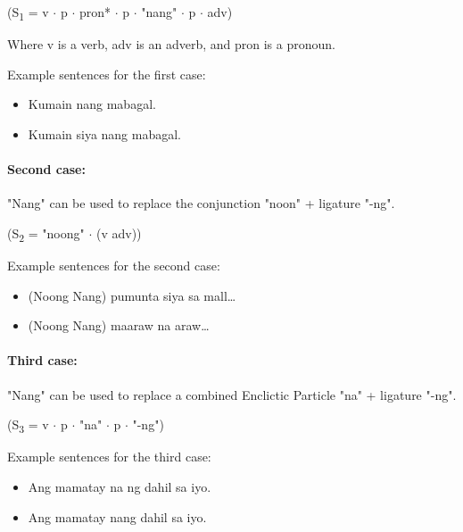 \begin{center}
      (S\textsubscript{1} = v \(\cdot\) p \(\cdot\) pron* \(\cdot\) p \(\cdot\)
      "nang" \(\cdot\) p \(\cdot\) adv)
\end{center}

Where v is a verb, adv is an adverb, and pron is a pronoun.

\begin{example}
      Example sentences for the first case:
\end{example}
\begin{itemize}
      \item Kumain nang mabagal.
      \item             Kumain siya nang mabagal.

\end{itemize}

\paragraph{Second case:} "Nang" can be used to replace the conjunction "noon" +
ligature "-ng".

\begin{center}
      (S\textsubscript{2} = "noong" \(\cdot\) (v {\textpipe} adv))
\end{center}

\begin{example}
      Example sentences for the second case:
\end{example}

\begin{itemize}
      \item (Noong {\textpipe} Nang) pumunta siya sa mall…
      \item (Noong {\textpipe} Nang) maaraw na araw…
\end{itemize}

\paragraph{Third case:} "Nang" can be used to replace a combined Enclictic Particle
"na" + ligature "-ng".

\begin{center}
      (S\textsubscript{3} = v \(\cdot\) p \(\cdot\) "na" \(\cdot\) p \(\cdot\)
      "-ng")
\end{center}

\begin{example}
      Example sentences for the third case:
\end{example}
\begin{itemize}
      \item Ang mamatay na ng dahil sa iyo.
      \item Ang mamatay nang dahil sa iyo.
\end{itemize}

